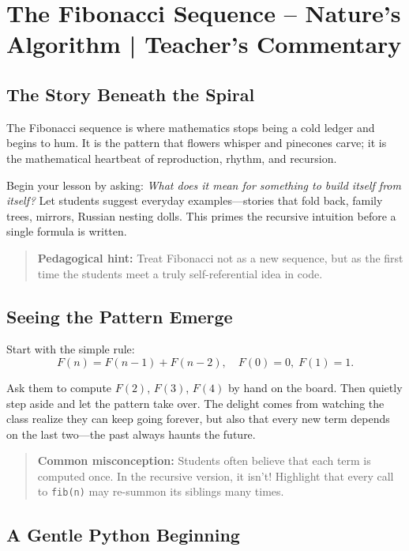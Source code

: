 \chapter{The Fibonacci Sequence -- Nature's Algorithm | Teacher's Commentary}
\label{ch:fibonacci-solution}

\section{The Story Beneath the Spiral}

The Fibonacci sequence is where mathematics stops being a cold ledger and begins
to hum.  It is the pattern that flowers whisper and pinecones carve; it is the
mathematical heartbeat of reproduction, rhythm, and recursion.

Begin your lesson by asking: \emph{What does it mean for something to build
itself from itself?}  Let students suggest everyday examples—stories that fold
back, family trees, mirrors, Russian nesting dolls.  This primes the recursive
intuition before a single formula is written.

\begin{quote}
\textbf{Pedagogical hint:} Treat Fibonacci not as a new sequence, but as the
first time the students meet a truly self-referential idea in code.
\end{quote}

\section{Seeing the Pattern Emerge}

Start with the simple rule:
\[
F(n) = F(n-1) + F(n-2), \quad F(0)=0, \; F(1)=1.
\]

Ask them to compute $F(2)$, $F(3)$, $F(4)$ by hand on the board.
Then quietly step aside and let the pattern take over.  The delight comes from
watching the class realize they can keep going forever, but also that every new
term depends on the last two—the past always haunts the future.

\begin{quote}
\textbf{Common misconception:}
Students often believe that each term is computed once.  In the recursive
version, it isn’t!  Highlight that every call to \texttt{fib(n)} may re-summon
its siblings many times.
\end{quote}

\section{A Gentle Python Beginning}


